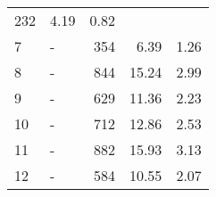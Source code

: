 \begin{longtable}{lXrrr}
       \num{232} &
       \num[round-mode=places,round-precision=2]{4.19} &
         \num[round-mode=places,round-precision=2]{0.82} \\

     7 &
     \multicolumn{1}{X}{ -  } &


       \num{354} &
       \num[round-mode=places,round-precision=2]{6.39} &
         \num[round-mode=places,round-precision=2]{1.26} \\

     8 &
     \multicolumn{1}{X}{ -  } &


       \num{844} &
       \num[round-mode=places,round-precision=2]{15.24} &
         \num[round-mode=places,round-precision=2]{2.99} \\

     9 &
     \multicolumn{1}{X}{ -  } &


       \num{629} &
       \num[round-mode=places,round-precision=2]{11.36} &
         \num[round-mode=places,round-precision=2]{2.23} \\

     10 &
     \multicolumn{1}{X}{ -  } &


       \num{712} &
       \num[round-mode=places,round-precision=2]{12.86} &
         \num[round-mode=places,round-precision=2]{2.53} \\

     11 &
     \multicolumn{1}{X}{ -  } &


       \num{882} &
       \num[round-mode=places,round-precision=2]{15.93} &
         \num[round-mode=places,round-precision=2]{3.13} \\

     12 &
     \multicolumn{1}{X}{ -  } &


       \num{584} &
       \num[round-mode=places,round-precision=2]{10.55} &
         \num[round-mode=places,round-precision=2]{2.07} \\


\end{longtable}
